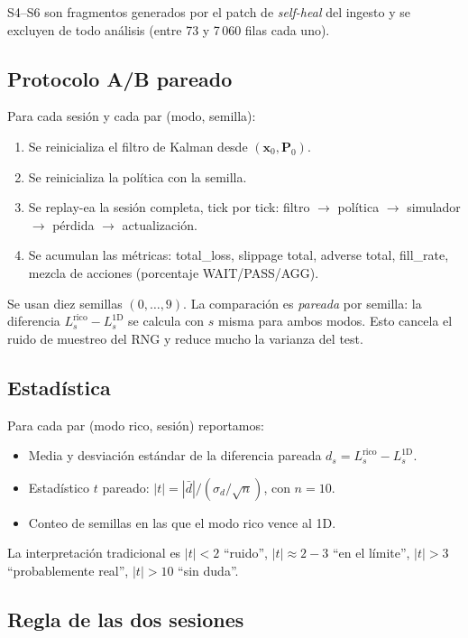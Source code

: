 \documentclass[journal,onecolumn,11pt]{IEEEtran}
\newcommand{\xv}{\mathbf{x}}
\newcommand{\Pm}{\mathbf{P}}
\begin{document}
S4--S6 son fragmentos generados por el patch de \emph{self-heal} del
ingesto y se excluyen de todo análisis (entre 73 y 7\,060 filas
cada uno).

\subsection{Protocolo A/B pareado}

Para cada sesión y cada par (modo, semilla):
\begin{enumerate}
\item Se reinicializa el filtro de Kalman desde $(\xv_0,\Pm_0)$.
\item Se reinicializa la política con la semilla.
\item Se replay-ea la sesión completa, tick por tick: filtro
      $\to$ política $\to$ simulador $\to$ pérdida $\to$ actualización.
\item Se acumulan las métricas: total\_loss, slippage total, adverse
      total, fill\_rate, mezcla de acciones (porcentaje WAIT/PASS/AGG).
\end{enumerate}

Se usan diez semillas $(0,\ldots,9)$. La comparación es \emph{pareada}
por semilla: la diferencia $L^{\text{rico}}_s - L^{\text{1D}}_s$ se
calcula con $s$ misma para ambos modos. Esto cancela el ruido de
muestreo del RNG y reduce mucho la varianza del test.

\subsection{Estadística}

Para cada par (modo rico, sesión) reportamos:
\begin{itemize}
\item Media y desviación estándar de la diferencia pareada
      $d_s = L^{\text{rico}}_s - L^{\text{1D}}_s$.
\item Estadístico $t$ pareado: $|t| = |\bar d|/(\sigma_d/\sqrt{n})$,
      con $n=10$.
\item Conteo de semillas en las que el modo rico vence al 1D.
\end{itemize}
La interpretación tradicional es $|t|<2$ ``ruido'',
$|t|\!\approx\!2{-}3$ ``en el límite'', $|t|>3$ ``probablemente real'',
$|t|>10$ ``sin duda''.

\subsection{Regla de las dos sesiones}
\end{document}
